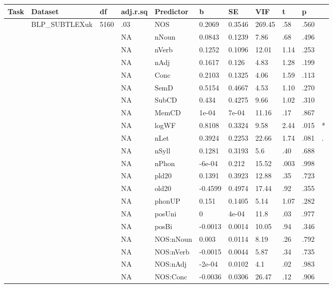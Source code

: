 \begin{table}[ht]
\centering
\begingroup\normalsize
\begin{tabular}{lllllllllll}
  \hline
Task & Dataset & df & adj.r.sq & Predictor & b & SE & VIF & t & p &  \\ 
  \hline
 & BLP\_SUBTLEXuk & 5160 & .03 & NOS & 0.2069 & 0.3546 & 269.45 & .58 & .560 &   \\ 
   &  &  & NA & nNoun & 0.0843 & 0.1239 & 7.86 & .68 & .496 &   \\ 
   &  &  & NA & nVerb & 0.1252 & 0.1096 & 12.01 & 1.14 & .253 &   \\ 
   &  &  & NA & nAdj & 0.1617 & 0.126 & 4.83 & 1.28 & .199 &   \\ 
   &  &  & NA & Conc & 0.2103 & 0.1325 & 4.06 & 1.59 & .113 &   \\ 
   &  &  & NA & SemD & 0.5154 & 0.4667 & 4.53 & 1.10 & .270 &   \\ 
   &  &  & NA & SubCD & 0.434 & 0.4275 & 9.66 & 1.02 & .310 &   \\ 
   &  &  & NA & MemCD & 1e-04 & 7e-04 & 11.16 & .17 & .867 &   \\ 
   &  &  & NA & logWF & 0.8108 & 0.3324 & 9.58 & 2.44 & .015 & * \\ 
   &  &  & NA & nLet & 0.3924 & 0.2253 & 22.66 & 1.74 & .081 & . \\ 
   &  &  & NA & nSyll & 0.1281 & 0.3193 & 5.6 & .40 & .688 &   \\ 
   &  &  & NA & nPhon & -6e-04 & 0.212 & 15.52 & .003 & .998 &   \\ 
   &  &  & NA & pld20 & 0.1391 & 0.3923 & 12.88 & .35 & .723 &   \\ 
   &  &  & NA & old20 & -0.4599 & 0.4974 & 17.44 & .92 & .355 &   \\ 
   &  &  & NA & phonUP & 0.151 & 0.1405 & 5.14 & 1.07 & .282 &   \\ 
   &  &  & NA & posUni & 0 & 4e-04 & 11.8 & .03 & .977 &   \\ 
   &  &  & NA & posBi & -0.0013 & 0.0014 & 10.05 & .94 & .346 &   \\ 
   &  &  & NA & NOS:nNoun & 0.003 & 0.0114 & 8.19 & .26 & .792 &   \\ 
   &  &  & NA & NOS:nVerb & -0.0015 & 0.0044 & 5.87 & .34 & .735 &   \\ 
   &  &  & NA & NOS:nAdj & -2e-04 & 0.0102 & 4.1 & .02 & .983 &   \\ 
   &  &  & NA & NOS:Conc & -0.0036 & 0.0306 & 26.47 & .12 & .906 &   \\ 

\end{tabular}
\end{table}
